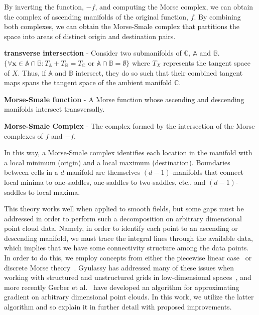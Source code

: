 By inverting the function, $-f$, and computing the Morse complex, we can obtain the complex of ascending manifolds of the original function, $f$.
%
By combining both complexes, we can obtain the Morse-Smale complex that partitions the space into areas of distinct origin and destination pairs.


\begin{defn}
\textbf{transverse intersection} - Consider two submanifolds of $\mathbb{C}$, $\mathbb{A}$ and $\mathbb{B}$. $\{\forall \mathbf{x} \in \mathbb{A} \cap \mathbb{B}: T_{\mathbb{A}} + T_{\mathbb{B}} = T_{\mathbb{C}} \text{ or } \mathbb{A} \cap \mathbb{B} = \emptyset\}$ where $T_{X}$ represents the tangent space of $X$.
%
Thus, if $\mathbb{A}$ and $\mathbb{B}$ intersect, they do so such that their combined tangent maps spans the tangent space of the ambient manifold $\mathbb{C}$.
\end{defn}

\begin{defn}
\textbf{Morse-Smale function} - A Morse function whose ascending and descending manifolds intersect transversally.
\end{defn}

\begin{defn}
\textbf{Morse-Smale Complex} - The complex formed by the intersection of the Morse complexes of $f$ and $-f$.
\end{defn}

In this way, a Morse-Smale complex identifies each location in the manifold with a local minimum (origin) and a local maximum (destination).
%
Boundaries between cells in a $d$-manifold are themselves $(d-1)$-manifolds that connect local minima to one-saddles, one-saddles to two-saddles, etc., and $(d-1)$-saddles to local maxima.


This theory works well when applied to smooth fields, but some gaps must be addressed in order to perform such a decomposition on arbitrary dimensional point cloud data.
%
Namely, in order to identify each point to an ascending or descending manifold, we must trace the integral lines through the available data, which implies that we have some connectivity structure among the data points.
%
In order to do this, we employ concepts from either the piecewise linear case~\cite{EdelsbrunnerLetscherZomorodian2002} or discrete Morse theory~\cite{Forman2002}.
%
Gyulassy has addressed many of these issues when working with structured and unstructured grids in low-dimensional spaces~\cite{Gyulassy2008}, and more recently Gerber et al.~\cite{GerberBremerPascucci2010} have developed an algorithm for approximating gradient on arbitrary dimensional point clouds.
%
In this work, we utilize the latter algorithm and so explain it in further detail with proposed improvements.


